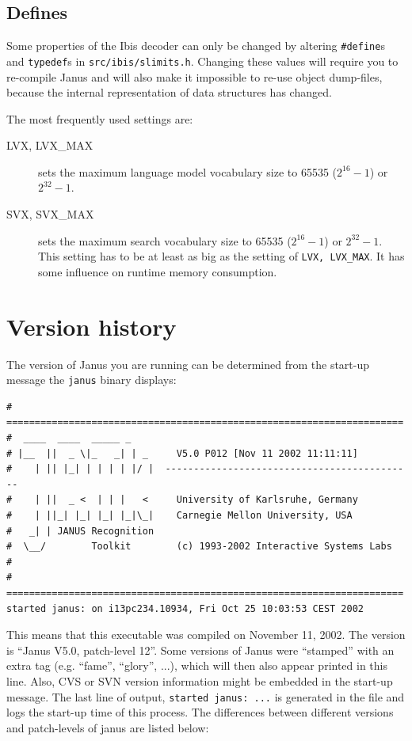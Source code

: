 \documentclass[a4paper,twoside]{book}
\newcommand{\Jref}      [2]{\htmlref{\texttt{#2}}{#1:#2}}
\begin{document}
\subsection*{Defines}

Some properties of  the Ibis decoder  can only be changed  by altering
\texttt{\#define}s           and         \texttt{typedef}s          in
\texttt{src/ibis/slimits.h}. Changing these values will require you to
re-compile  Janus and will  also  make it  impossible to re-use object
dump-files, because the internal representation of data structures has
changed.

The most frequently used settings are:

\begin{description}

\item[LVX, LVX\_MAX] sets the maximum language model vocabulary size to
65535 ($2^{16}-1$) or $2^{32}-1$.

\item[SVX, SVX\_MAX] sets the maximum search  vocabulary size to 65535
($2^{16}-1$) or $2^{32}-1$. This setting has to be  at least as big as
the  setting of  \texttt{LVX, LVX\_MAX}.   It  has some  influence  on
runtime memory consumption.

\end{description}


\section{Version history} \label{basic:history}

The version of Janus you are running can be determined from the
start-up message the \texttt{janus} binary displays:

\small{\begin{verbatim}
# ======================================================================
#  ____  ____  _____ _
# |__  ||  _ \|_   _| | _     V5.0 P012 [Nov 11 2002 11:11:11]
#    | || |_| | | | | |/ |  --------------------------------------------
#    | ||  _ <  | | |   <     University of Karlsruhe, Germany
#    | ||_| |_| |_| |_|\_|    Carnegie Mellon University, USA
#   _| | JANUS Recognition
#  \__/        Toolkit        (c) 1993-2002 Interactive Systems Labs
#
# ======================================================================
started janus: on i13pc234.10934, Fri Oct 25 10:03:53 CEST 2002
\end{verbatim}}

This means that this executable was compiled on November 11, 2002. The
version is  ``Janus V5.0, patch-level  12''.  Some versions  of Janus
were ``stamped'' with an  extra tag (e.g.  ``fame'', ``glory'', ...),
which will  then also appear printed  in this line. Also,  CVS or SVN
version information  might be embedded  in the start-up  message. The
last line of output, \texttt{started janus: ...}  is generated in the
file  \Jref{file}{.janusrc}  and  logs  the  start-up  time  of  this
process.  The differences between different versions and patch-levels
of janus are listed below:
\end{document}
